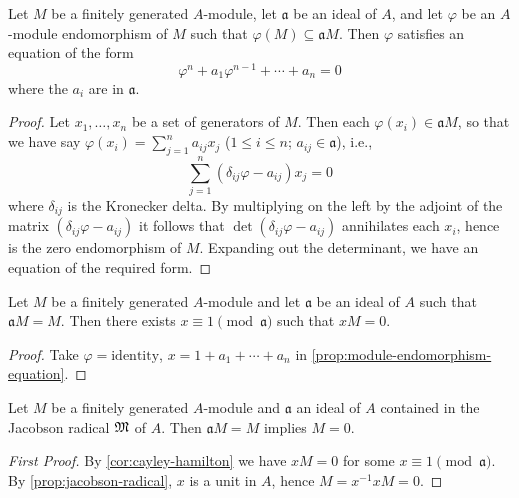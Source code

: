 \begin{proposition}\label{prop:module-endomorphism-equation}
    Let $M$ be a finitely generated $A$-module, let $\mathfrak{a}$ be an ideal of $A$, and let $\varphi$ be an $A$-module endomorphism of $M$ such that $\varphi(M) \subseteq \mathfrak{a}M$. Then $\varphi$ satisfies an equation of the form
    \[
        \varphi^n + a_1 \varphi^{n-1} + \cdots + a_n = 0
    \]
    where the $a_i$ are in $\mathfrak{a}$.
\end{proposition}

\begin{proof}
    Let $x_1, \ldots, x_n$ be a set of generators of $M$. Then each $\varphi(x_i) \in \mathfrak{a}M$, so that we have say $\varphi(x_i) = \sum_{j=1}^n a_{ij}x_j$ ($1 \leq i \leq n$; $a_{ij} \in \mathfrak{a}$), i.e.,
    \[
        \sum_{j=1}^n (\delta_{ij}\varphi - a_{ij})x_j = 0
    \]
    where $\delta_{ij}$ is the Kronecker delta. By multiplying on the left by the adjoint of the matrix $(\delta_{ij}\varphi - a_{ij})$ it follows that $\det(\delta_{ij}\varphi - a_{ij})$ annihilates each $x_i$, hence is the zero endomorphism of $M$. Expanding out the determinant, we have an equation of the required form.
\end{proof}

\begin{corollary}\label{cor:cayley-hamilton}
    Let $M$ be a finitely generated $A$-module and let $\mathfrak{a}$ be an ideal of $A$ such that $\mathfrak{a}M = M$. Then there exists $x \equiv 1 \pmod{\mathfrak{a}}$ such that $xM = 0$.
\end{corollary}

\begin{proof}
    Take $\varphi = \text{identity}$, $x = 1 + a_1 + \cdots + a_n$ in \eqref{prop:module-endomorphism-equation}.
\end{proof}

\begin{proposition}\label{pro:nakayama}
    Let $M$ be a finitely generated $A$-module and $\mathfrak{a}$ an ideal of $A$ contained in the Jacobson radical $\mathfrak{M}$ of $A$. Then $\mathfrak{a}M = M$ implies $M = 0$.
\end{proposition}

\begin{proof}[First Proof]
    By \eqref{cor:cayley-hamilton} we have $xM = 0$ for some $x \equiv 1 \pmod{\mathfrak{a}}$. By \eqref{prop:jacobson-radical}, $x$ is a unit in $A$, hence $M = x^{-1}xM = 0$.
\end{proof}

